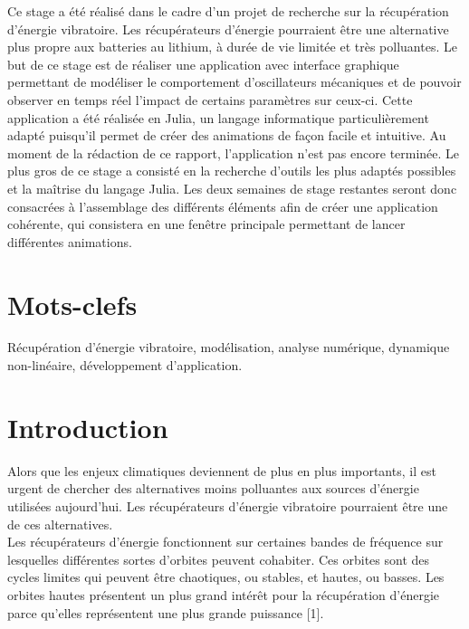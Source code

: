 \documentclass[a4paper, french, 12pt, titlepage]{article}
\begin{document}
Ce stage a été réalisé dans le cadre d'un projet de recherche sur la récupération d'énergie vibratoire. Les récupérateurs d'énergie pourraient être une alternative plus propre aux batteries au lithium, à durée de vie limitée et très polluantes. Le but de ce stage est de réaliser une application avec interface graphique permettant de modéliser le comportement d'oscillateurs mécaniques et de pouvoir observer en temps réel l'impact de certains paramètres sur ceux-ci. Cette application a été réalisée en Julia, un langage informatique particulièrement adapté puisqu'il permet de créer des animations de façon facile et intuitive. Au moment de la rédaction de ce rapport, l'application n'est pas encore terminée. Le plus gros de ce stage a consisté en la recherche d'outils les plus adaptés possibles et la maîtrise du langage Julia. Les deux semaines de stage restantes seront donc consacrées à l'assemblage des différents éléments afin de créer une application cohérente, qui consistera en une fenêtre principale permettant de lancer différentes animations. 



\section*{Mots-clefs}

Récupération d'énergie vibratoire, modélisation, analyse numérique, dynamique non-linéaire, développement d'application.

\newpage 

\tableofcontents

\newpage 



\section{Introduction}

Alors que les enjeux climatiques deviennent de plus en plus importants, il est urgent de chercher des alternatives moins polluantes aux sources d'énergie utilisées aujourd'hui. Les récupérateurs d'énergie vibratoire pourraient être une de ces alternatives. \\ 

Les récupérateurs d'énergie fonctionnent sur certaines bandes de fréquence sur lesquelles différentes sortes d'orbites peuvent cohabiter. Ces orbites sont des cycles limites qui peuvent être chaotiques, ou stables, et hautes, ou basses. Les orbites hautes présentent un plus grand intérêt pour la récupération d'énergie parce qu'elles représentent une plus grande puissance [1]. \\ 
\end{document}
